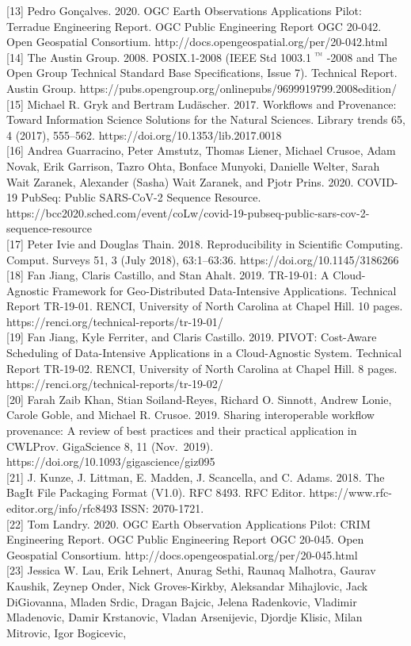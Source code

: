\documentclass[
]{article}
\begin{document}
{[}13{]} Pedro Gonçalves. 2020. OGC Earth Observations Applications
Pilot: Terradue Engineering Report. OGC Public Engineering Report OGC
20-042. Open Geospatial Consortium.
http://docs.opengeospatial.org/per/20-042.html\\
{[}14{]} The Austin Group. 2008. POSIX.1-2008 (IEEE Std 1003.1 \(^{™}\)
-2008 and The Open Group Technical Standard Base Specifications, Issue
7). Technical Report. Austin Group.
https://pubs.opengroup.org/onlinepubs/9699919799.2008edition/\\
{[}15{]} Michael R. Gryk and Bertram Ludäscher. 2017. Workflows and
Provenance: Toward Information Science Solutions for the Natural
Sciences. Library trends 65, 4 (2017), 555--562.
https://doi.org/10.1353/lib.2017.0018\\
{[}16{]} Andrea Guarracino, Peter Amstutz, Thomas Liener, Michael
Crusoe, Adam Novak, Erik Garrison, Tazro Ohta, Bonface Munyoki, Danielle
Welter, Sarah Wait Zaranek, Alexander (Sasha) Wait Zaranek, and Pjotr
Prins. 2020. COVID-19 PubSeq: Public SARS-CoV-2 Sequence Resource.
https://bcc2020.sched.com/event/coLw/covid-19-pubseq-public-sars-cov-2-sequence-resource\\
{[}17{]} Peter Ivie and Douglas Thain. 2018. Reproducibility in
Scientific Computing. Comput. Surveys 51, 3 (July 2018), 63:1--63:36.
https://doi.org/10.1145/3186266\\
{[}18{]} Fan Jiang, Claris Castillo, and Stan Ahalt. 2019. TR-19-01: A
Cloud-Agnostic Framework for Geo-Distributed Data-Intensive
Applications. Technical Report TR-19-01. RENCI, University of North
Carolina at Chapel Hill. 10 pages.
https://renci.org/technical-reports/tr-19-01/\\
{[}19{]} Fan Jiang, Kyle Ferriter, and Claris Castillo. 2019. PIVOT:
Cost-Aware Scheduling of Data-Intensive Applications in a Cloud-Agnostic
System. Technical Report TR-19-02. RENCI, University of North Carolina
at Chapel Hill. 8 pages. https://renci.org/technical-reports/tr-19-02/\\
{[}20{]} Farah Zaib Khan, Stian Soiland-Reyes, Richard O. Sinnott,
Andrew Lonie, Carole Goble, and Michael R. Crusoe. 2019. Sharing
interoperable workflow provenance: A review of best practices and their
practical application in CWLProv. GigaScience 8, 11 (Nov.~2019).
https://doi.org/10.1093/gigascience/giz095\\
{[}21{]} J. Kunze, J. Littman, E. Madden, J. Scancella, and C. Adams.
2018. The BagIt File Packaging Format (V1.0). RFC 8493. RFC Editor.
https://www.rfc-editor.org/info/rfc8493 ISSN: 2070-1721.\\
{[}22{]} Tom Landry. 2020. OGC Earth Observation Applications Pilot:
CRIM Engineering Report. OGC Public Engineering Report OGC 20-045. Open
Geospatial Consortium. http://docs.opengeospatial.org/per/20-045.html\\
{[}23{]} Jessica W. Lau, Erik Lehnert, Anurag Sethi, Raunaq Malhotra,
Gaurav Kaushik, Zeynep Onder, Nick Groves-Kirkby, Aleksandar Mihajlovic,
Jack DiGiovanna, Mladen Srdic, Dragan Bajcic, Jelena Radenkovic,
Vladimir Mladenovic, Damir Krstanovic, Vladan Arsenijevic, Djordje
Klisic, Milan Mitrovic, Igor Bogicevic,
\end{document}
